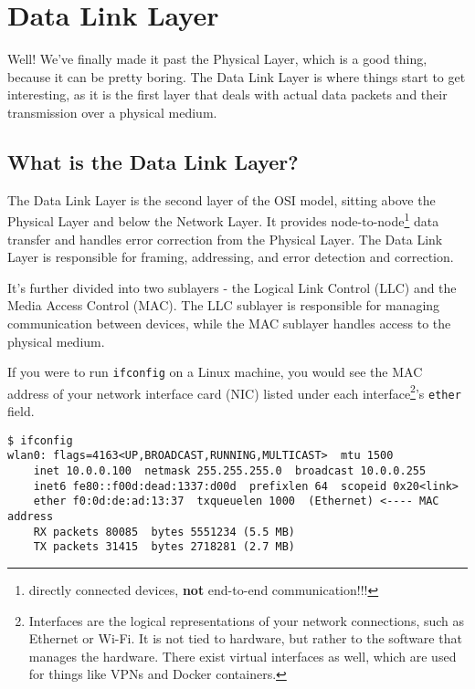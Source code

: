 \chapter{Data Link Layer}\label{sec:datalink_intro}
Well! We've finally made it past the Physical Layer, which is a good thing, because it can be pretty boring. The Data Link Layer is where things start to get interesting, as it is the first layer that deals with actual data packets and their transmission over a physical medium.


\section{What is the Data Link Layer?}
The Data Link Layer is the second layer of the OSI model, sitting above the Physical Layer and below the Network Layer. It provides node-to-node\footnote{
    directly connected devices, \textbf{not} end-to-end communication!!!
} data transfer and handles error correction from the Physical Layer. The Data Link Layer is responsible for framing, addressing, and error detection and correction.

It's further divided into two sublayers - the Logical Link Control (LLC) and the Media Access Control (MAC). The LLC sublayer is responsible for managing communication between devices, while the MAC sublayer handles access to the physical medium. 

If you were to run \texttt{ifconfig} on a Linux machine, you would see the MAC address of your network interface card (NIC) listed under each interface\footnote{
    Interfaces are the logical representations of your network connections, such as Ethernet or Wi-Fi. It is not tied to hardware, but rather to the software that manages the hardware. There exist virtual interfaces as well, which are used for things like VPNs and Docker containers.
}'s \texttt{ether} field.

\begin{verbatim}
$ ifconfig
wlan0: flags=4163<UP,BROADCAST,RUNNING,MULTICAST>  mtu 1500
    inet 10.0.0.100  netmask 255.255.255.0  broadcast 10.0.0.255
    inet6 fe80::f00d:dead:1337:d00d  prefixlen 64  scopeid 0x20<link>
    ether f0:0d:de:ad:13:37  txqueuelen 1000  (Ethernet) <---- MAC address
    RX packets 80085  bytes 5551234 (5.5 MB)
    TX packets 31415  bytes 2718281 (2.7 MB)
\end{verbatim}








